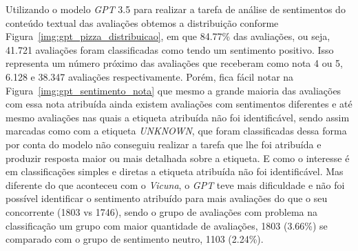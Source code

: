 Utilizando o modelo \textit{GPT} 3.5 para realizar a tarefa de análise de sentimentos do conteúdo textual das avaliações obtemos a distribuição conforme Figura~\ref{img:gpt_pizza_distribuicao}, em que 84.77\% das avaliações, ou seja, 41.721 avaliações foram classificadas como tendo um sentimento positivo. Isso representa um número próximo das avaliações que receberam como nota 4 ou 5, 6.128 e 38.347 avaliações respectivamente. Porém, fica fácil notar na Figura~\ref{img:gpt_sentimento_nota} que mesmo a grande maioria das avaliações com essa nota atribuída ainda existem avaliações com sentimentos diferentes e até mesmo avaliações nas quais a etiqueta atribuída não foi identificável, sendo assim marcadas como com a etiqueta \textit{UNKNOWN}, que foram classificadas dessa forma por conta do modelo não conseguiu realizar a tarefa que lhe foi atribuída e produzir resposta maior ou mais detalhada sobre a etiqueta. E como o interesse é em classificações simples e diretas a etiqueta atribuída não foi identificável. Mas diferente do que aconteceu com o \textit{Vicuna}, o \textit{GPT} teve mais dificuldade e não foi possível identificar o sentimento atribuído para mais avaliações do que o seu concorrente (1803 vs 1746), sendo o grupo de avaliações com problema na classificação um grupo com maior quantidade de avaliações, 1803 (3.66\%) se comparado com o grupo de sentimento neutro, 1103 (2.24\%).

